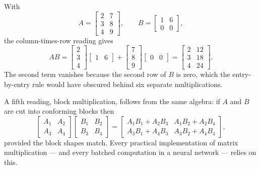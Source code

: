 
\begin{example}
With
\[
	A=\begin{bmatrix}2&7\\3&8\\4&9\end{bmatrix},
	\qquad
	B=\begin{bmatrix}1&6\\0&0\end{bmatrix},
\]
the column-times-row reading gives
\[
	AB=\begin{bmatrix}2\\3\\4\end{bmatrix}\begin{bmatrix}1&6\end{bmatrix}
	+\begin{bmatrix}7\\8\\9\end{bmatrix}\begin{bmatrix}0&0\end{bmatrix}
	=\begin{bmatrix}2&12\\3&18\\4&24\end{bmatrix}.
\]
The second term vanishes because the second row of \(B\) is zero, which the
entry-by-entry rule would have obscured behind six separate multiplications.
\end{example}

A fifth reading, block multiplication, follows from the same algebra: if \(A\)
and \(B\) are cut into conforming blocks then
\[
	\begin{bmatrix}A_1&A_2\\A_3&A_4\end{bmatrix}
	\begin{bmatrix}B_1&B_2\\B_3&B_4\end{bmatrix}
	=\begin{bmatrix}A_1B_1+A_2B_3 & A_1B_2+A_2B_4\\
	                A_3B_1+A_4B_3 & A_3B_2+A_4B_4\end{bmatrix},
\]
provided the block shapes match. Every practical implementation of matrix
multiplication --- and every batched computation in a neural network --- relies
on this.

